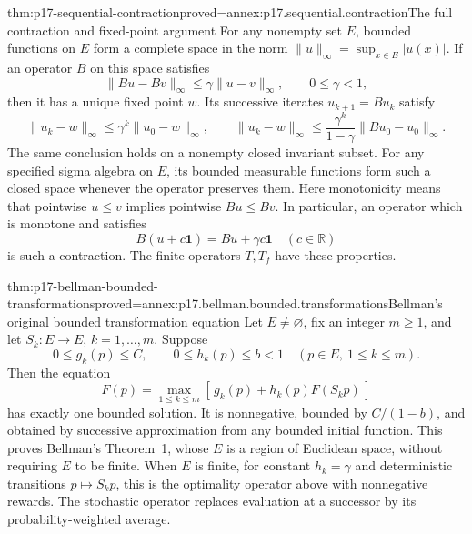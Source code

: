 \begin{hblemma}{thm:p17-sequential-contraction}{proved=annex:p17.sequential.contraction}{The full contraction and fixed-point argument}
For any nonempty set \(E\), bounded functions on \(E\)
form a complete space in the norm
\(\|u\|_\infty=\sup_{x\in E}|u(x)|\).
If an operator \(B\) on this space satisfies
\[
                 \|Bu-Bv\|_\infty\leq\gamma\|u-v\|_\infty,
                         \qquad 0\leq\gamma<1,
\]
then it has a unique fixed point \(w\). Its successive iterates
\(u_{k+1}=Bu_k\) satisfy
\[
 \|u_k-w\|_\infty\leq\gamma^k\|u_0-w\|_\infty,\qquad
 \|u_k-w\|_\infty\leq
               \frac{\gamma^k}{1-\gamma}\|Bu_0-u_0\|_\infty.
\]
The same conclusion holds on a nonempty closed invariant subset.
For any specified sigma algebra on \(E\), its bounded measurable
functions form such a closed space whenever the operator preserves them.
Here monotonicity means that pointwise \(u\leq v\) implies
pointwise \(Bu\leq Bv\).
In particular, an operator which is monotone and satisfies
\[
                  B(u+c\mathbf1)=Bu+\gamma c\mathbf1
                           \quad(c\in\mathbb R)
\]
is such a contraction. The finite operators \(T,T_f\) have
these properties.
\end{hblemma}

\begin{hbtheorem}{thm:p17-bellman-bounded-transformations}{proved=annex:p17.bellman.bounded.transformations}{Bellman's original bounded transformation equation}
Let \(E\ne\varnothing\), fix an integer \(m\geq1\),
and let \(S_k:E\to E\), \(k=1,\ldots,m\).
Suppose
\[
       0\leq g_k(p)\leq C,\qquad
       0\leq h_k(p)\leq b<1
                  \quad(p\in E,\ 1\leq k\leq m).
\]
Then the equation
\[
            F(p)=\max_{1\leq k\leq m}
                      [\,g_k(p)+h_k(p)F(S_kp)\,]
\]
has exactly one bounded solution. It is nonnegative, bounded
by \(C/(1-b)\), and obtained by successive approximation
from any bounded initial function.
This proves Bellman's Theorem~1, whose \(E\) is a region
of Euclidean space, without requiring \(E\) to be finite.
When \(E\) is finite, for constant \(h_k=\gamma\) and deterministic transitions
\(p\mapsto S_kp\), this is the optimality operator above
with nonnegative rewards. The stochastic operator replaces
evaluation at a successor by its probability-weighted average.
\end{hbtheorem}

